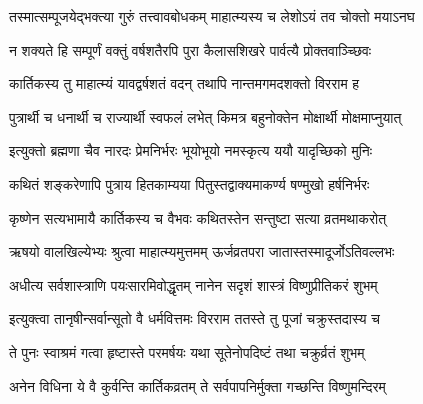 \twolineshloka
{तस्मात्सम्पूजयेद्भक्त्या गुरुं तत्त्वावबोधकम्}
{माहात्म्यस्य च लेशोऽयं तव चोक्तो मयाऽनघ} %

\twolineshloka
{न शक्यते हि सम्पूर्णं वक्तुं वर्षशतैरपि}
{पुरा कैलासशिखरे पार्वत्यै प्रोक्तवाञ्च्छिवः} %

\twolineshloka
{कार्तिकस्य तु माहात्म्यं यावद्वर्षशतं वदन्}
{तथापि नान्तमगमदशक्तो विरराम ह} %

\twolineshloka
{पुत्रार्थी च धनार्थी च राज्यार्थी स्वफलं लभेत्}
{किमत्र बहुनोक्तेन मोक्षार्थी मोक्षमाप्नुयात्} %


\twolineshloka
{इत्युक्तो ब्रह्मणा चैव नारदः प्रेमनिर्भरः}
{भूयोभूयो नमस्कृत्य ययौ यादृच्छिको मुनिः} %

\twolineshloka
{कथितं शङ्करेणापि पुत्राय हितकाम्यया}
{पितुस्तद्वाक्यमाकर्ण्य षण्मुखो हर्षनिर्भरः} %

\twolineshloka
{कृष्णेन सत्यभामायै कार्तिकस्य च वैभवः}
{कथितस्तेन सन्तुष्टा सत्या व्रतमथाकरोत्} %

\twolineshloka
{ऋषयो वालखिल्येभ्यः श्रुत्वा माहात्म्यमुत्तमम्}
{ऊर्जव्रतपरा जातास्तस्मादूर्जोऽतिवल्लभः} %

\twolineshloka
{अधीत्य सर्वशास्त्राणि पयःसारमिवोद्धृतम्}
{नानेन सदृशं शास्त्रं विष्णुप्रीतिकरं शुभम्} %


\twolineshloka
{इत्युक्त्वा तानृषीन्सर्वान्सूतो वै धर्मवित्तमः}
{विरराम ततस्ते तु पूजां चक्रुस्तदास्य च} %

\twolineshloka
{ते पुनः स्वाश्रमं गत्वा हृष्टास्ते परमर्षयः}
{यथा सूतेनोपदिष्टं तथा चक्रुर्व्रतं शुभम्} %

\twolineshloka
{अनेन विधिना ये वै कुर्वन्ति कार्तिकव्रतम्}
{ते सर्वपापनिर्मुक्ता गच्छन्ति विष्णुमन्दिरम्} %



\endgroup